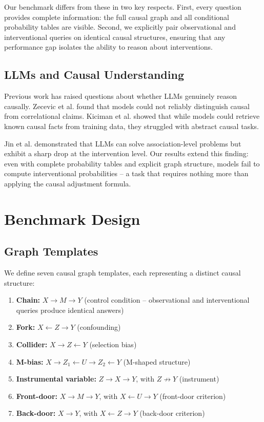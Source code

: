 \documentclass[11pt,a4paper]{article}
\begin{document}
Our benchmark differs from these in two key respects. First, every question provides complete information: the full causal graph and all conditional probability tables are visible. Second, we explicitly pair observational and interventional queries on identical causal structures, ensuring that any performance gap isolates the ability to reason about interventions.

\subsection{LLMs and Causal Understanding}

Previous work has raised questions about whether LLMs genuinely reason causally. Zecevic et al. \cite{zecevic2023causal} found that models could not reliably distinguish causal from correlational claims. Kiciman et al. \cite{kiciman2024causal} showed that while models could retrieve known causal facts from training data, they struggled with abstract causal tasks.

Jin et al. \cite{jin2024cladder} demonstrated that LLMs can solve association-level problems but exhibit a sharp drop at the intervention level. Our results extend this finding: even with complete probability tables and explicit graph structure, models fail to compute interventional probabilities -- a task that requires nothing more than applying the causal adjustment formula.

\section{Benchmark Design}

\subsection{Graph Templates}

We define seven causal graph templates, each representing a distinct causal structure:

\begin{enumerate}
  \item \textbf{Chain:} $X \rightarrow M \rightarrow Y$ (control condition -- observational and interventional queries produce identical answers)
  \item \textbf{Fork:} $X \leftarrow Z \rightarrow Y$ (confounding)
  \item \textbf{Collider:} $X \rightarrow Z \leftarrow Y$ (selection bias)
  \item \textbf{M-bias:} $X \rightarrow Z_1 \leftarrow U \rightarrow Z_2 \leftarrow Y$ (M-shaped structure)
  \item \textbf{Instrumental variable:} $Z \rightarrow X \rightarrow Y$, with $Z \not\rightarrow Y$ (instrument)
  \item \textbf{Front-door:} $X \rightarrow M \rightarrow Y$, with $X \leftarrow U \rightarrow Y$ (front-door criterion)
  \item \textbf{Back-door:} $X \rightarrow Y$, with $X \leftarrow Z \rightarrow Y$ (back-door criterion)
\end{enumerate}
\end{document}
